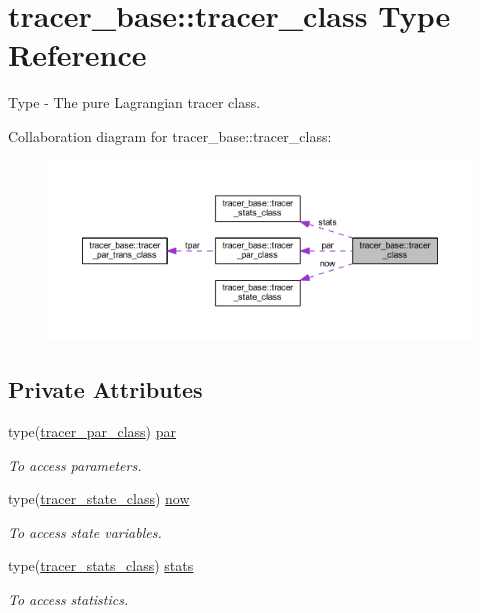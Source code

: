 \hypertarget{structtracer__base_1_1tracer__class}{}\section{tracer\+\_\+base\+:\+:tracer\+\_\+class Type Reference}
\label{structtracer__base_1_1tracer__class}


Type -\/ The pure Lagrangian tracer class.  




Collaboration diagram for tracer\+\_\+base\+:\+:tracer\+\_\+class\+:
\nopagebreak
\begin{figure}[H]
\begin{center}
\leavevmode
\includegraphics[width=350pt]{structtracer__base_1_1tracer__class__coll__graph}
\end{center}
\end{figure}
\subsection*{Private Attributes}
\begin{DoxyCompactItemize}
\item 
type(\mbox{\hyperlink{structtracer__base_1_1tracer__par__class}{tracer\+\_\+par\+\_\+class}}) \mbox{\hyperlink{structtracer__base_1_1tracer__class_a65acca4d35b24ec0b60eb32574004364}{par}}
\begin{DoxyCompactList}\small\item\em To access parameters. \end{DoxyCompactList}\item 
type(\mbox{\hyperlink{structtracer__base_1_1tracer__state__class}{tracer\+\_\+state\+\_\+class}}) \mbox{\hyperlink{structtracer__base_1_1tracer__class_aa0489335062707afec2dbbb978f0c68d}{now}}
\begin{DoxyCompactList}\small\item\em To access state variables. \end{DoxyCompactList}\item 
type(\mbox{\hyperlink{structtracer__base_1_1tracer__stats__class}{tracer\+\_\+stats\+\_\+class}}) \mbox{\hyperlink{structtracer__base_1_1tracer__class_a44167d106dc210e434106087e4a19578}{stats}}
\begin{DoxyCompactList}\small\item\em To access statistics. \end{DoxyCompactList}\end{DoxyCompactItemize}


